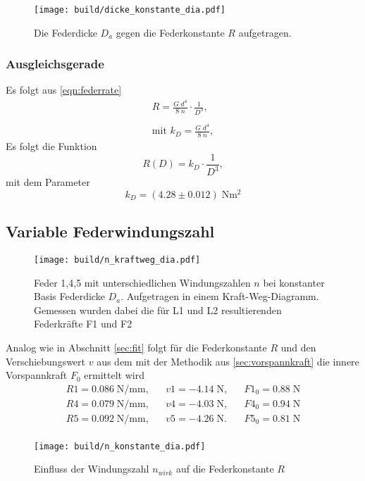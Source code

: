 \begin{figure}[H]
  \center
  \texttt{[image: build/dicke\_konstante\_dia.pdf]}
  \caption{Die Federdicke $D_a$ gegen die Federkonstante $R$ aufgetragen.}
\end{figure}

\subsubsection{Ausgleichsgerade}

Es folgt aus \ref{eqn:federrate}
\begin{align*}
  R=\frac{G\;d^4}{8\;n}\cdot \frac{1}{D^3}, \\\\  
  \text{mit }k_D =\frac{G\;d^4}{8\;n},
\end{align*}
Es folgt die Funktion
\begin{equation*}
  R(D)=k_D \cdot \frac{1}{D^3},
\end{equation*}
mit dem Parameter
\begin{equation*}
  k_D=(4.28 \pm 0.012) \;\si{\N\meter\squared}
\end{equation*}


\subsection{Variable Federwindungszahl}
\begin{figure}[H]
    \center
    \texttt{[image: build/n\_kraftweg\_dia.pdf]}
    \caption{Feder 1,4,5 mit unterschiedlichen Windungszahlen $n$ bei konstanter Basis Federdicke $D_a$.
    Aufgetragen in einem Kraft-Weg-Diagramm. Gemessen wurden dabei die für L1
    und L2 resultierenden Federkräfte F1 und F2}
\end{figure}
Analog wie in Abschnitt \ref{sec:fit} folgt für die Federkonstante $R$
und den Verschiebungswert $v$ aus dem mit der Methodik aus \ref{sec:vorspannkraft}
die innere Vorspannkraft $F_0$ ermittelt wird
\begin{align*}
  R1= 0.086\;\si{\N\per\mm}, &&  v1= -4.14\;\si{\N}, && F1_0=0.88\;\si{\N}\\
  R4= 0.079\;\si{\N\per\mm}, &&  v4= -4.03\;\si{\N}, && F4_0=0.94\;\si{\N}\\
  R5= 0.092\;\si{\N\per\mm}, &&  v5= -4.26\;\si{\N}. && F5_0=0.81\;\si{\N}\\
\end{align*}

\begin{figure}[H]
  \center
  \texttt{[image: build/n\_konstante\_dia.pdf]}
  \caption{Einfluss der Windungszahl $n_{wirk}$ auf die Federkonstante $R$}
\end{figure}

